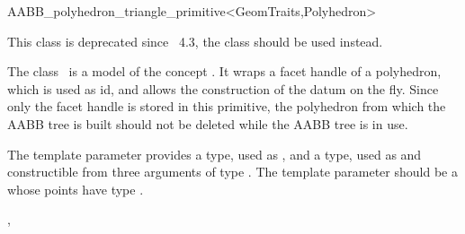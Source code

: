 \ccRefPageBegin



\begin{ccRefClass}{AABB_polyhedron_triangle_primitive<GeomTraits,Polyhedron>}


This class is deprecated since \cgal\ 4.3, the class  should be used instead.

\begin{ccDeprecated}
\ccDefinition
  
The class \ccRefName\ is a model of the concept . It wraps a facet handle of a polyhedron, which is used as id, and allows the construction of the datum on the fly. Since only the facet handle is stored in this primitive, the polyhedron from which the AABB tree is built should not be deleted while the AABB tree is in use.

\ccParameters
The template parameter  provides a  type, used as , and a  type, used as  and constructible from three arguments of type . The template parameter  should be a  whose points have type .


\ccTypes

\ccGlue
{}

\ccSeeAlso

,\\
\\
\end{ccDeprecated}

\end{ccRefClass}

\ccRefPageEnd

